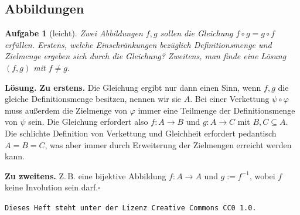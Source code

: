 \documentclass[a4paper,10pt,fleqn,twoside]{scrartcl}
\numberwithin{equation}{section}
\newcommand{\strong}[1]{{\normalfont\sffamily\bfseries #1}}
\renewcommand{\qedsymbol}{\ensuremath{\square}}
\theoremstyle{Aufgabe}
\newtheorem{Aufgabe}{\sffamily Aufgabe}[section]
\begin{document}
\subsection{Abbildungen}

\begin{Aufgabe}[leicht]
Zwei Abbildungen $f,g$ sollen die Gleichung $f\circ g = g\circ f$
erfüllen. Erstens, welche Einschränkungen bezüglich Definitionsmenge
und Zielmenge ergeben sich durch die Gleichung? Zweitens, man finde
eine Lösung $(f,g)$ mit $f\ne g$.
\end{Aufgabe}
\strong{Lösung.} \strong{Zu erstens.}
Die Gleichung ergibt nur dann einen Sinn,
wenn $f,g$ die gleiche Definitionsmenge besitzen, nennen wir sie
$A$. Bei einer Verkettung $\psi\circ\varphi$ muss außerdem die
Zielmenge von $\varphi$ immer eine Teilmenge der Definitionsmenge
von $\psi$ sein. Die Gleichung erfordert also $f\colon A\to B$ und
$g\colon A\to C$ mit $B,C\subseteq A$. Die schlichte Definition
von Verkettung und Gleichheit erfordert pedantisch $A=B=C$,
was aber immer durch Erweiterung der Zielmengen erreicht werden
kann.

\strong{Zu zweitens.}
Z.\,B. eine bijektive Abbildung $f\colon A\to A$ und
$g:=f^{-1}$, wobei $f$ keine Involution sein darf.\;\qedsymbol

\vfill\noindent
\texttt{Dieses Heft steht unter der Lizenz Creative Commons CC0 1.0.}
\end{document}
